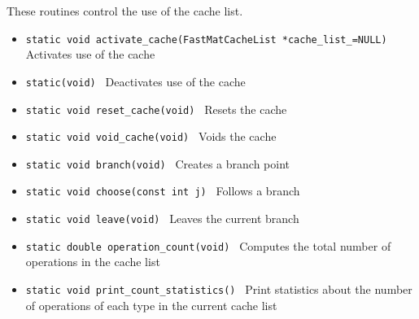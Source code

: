 {

These routines control the use of the cache list.

\begin{itemize}
\item \verb+static void activate_cache(FastMatCacheList *cache_list_=NULL) +
              Activates use of the cache 
\item \verb+static(void) +
              Deactivates use of the cache 
\item \verb+static void reset_cache(void) +
              Resets the cache 
\item \verb+static void void_cache(void) +
              Voids the cache 
\item \verb+static void branch(void) +
              Creates a branch point 
\item \verb+static void choose(const int j) +
              Follows a branch 
\item \verb+static void leave(void) +
              Leaves the current branch 
\item \verb+static double operation_count(void) +
              Computes the total number of operations in the cache list 
\item \verb+static void print_count_statistics() +
              Print statistics about the number of operations of
                each type in the current cache list 
\end{itemize}
} %



